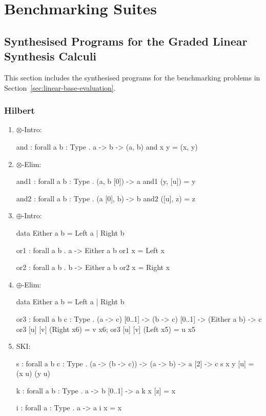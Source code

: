 \chapter{Benchmarking Suites}
\label{appendix:benchmarks}

\section{Synthesised Programs for the Graded Linear Synthesis Calculi}
\label{sec:linear-benchmarks}
This section includes the synthesised programs for the benchmarking problems in
Section~\ref{sec:linear-base-evaluation}. 

\subsection{Hilbert}
\begin{enumerate}
\item $\otimes$-Intro:
\begin{granule}
and : forall { a b : Type } . a -> b -> (a, b)
and x y = (x, y)
\end{granule}
\item $\otimes$-Elim: \\ 
\begin{granule}
and1 : forall { a b : Type } .  (a, b [0]) -> a
and1 (y, [u]) = y
    
and2 : forall { a b : Type } . (a [0], b) -> b
and2 ([u], z) = z
\end{granule}
\item $\oplus$-Intro: 
\begin{granule}
data Either a b = Left a | Right b

or1 : forall a b . a -> Either a b
or1 x = Left x

or2 : forall a b . b -> Either a b
or2 x = Right x
\end{granule}
\item $\oplus$-Elim: 
\begin{granule}
data Either a b = Left a | Right b

or3 : forall { a b c : Type }
    . (a -> c) [0..1] 
    -> (b -> c) [0..1] 
    -> (Either a b) 
    -> c
or3 [u] [v] (Right x6) = v x6;
or3 [u] [v] (Left x5) = u x5
\end{granule}
\item SKI: 
\begin{granule}
s : forall { a b c : Type } 
  . (a -> (b -> c)) 
  -> (a -> b) 
  -> a [2] 
  -> c
s x y [u] = (x u) (y u)
    
k : forall { a b : Type } . a -> b [0..1] -> a
k x [z] = x
    
i : forall { a : Type } . a -> a
i x = x
\end{granule}
\end{enumerate}


